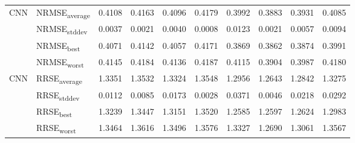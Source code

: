{\begin{longtable}{l l c c c c c c c c}
\cmidrule(lr){2-10}
\multirow{4}{*}{CNN} & NRMSE\textsubscript{average} & 0.4108 & 0.4163 & 0.4096 & 0.4179 & 0.3992 & 0.3883 & 0.3931 & 0.4085 \\
 & NRMSE\textsubscript{stddev} & 0.0037 & 0.0021 & 0.0040 & 0.0008 & 0.0123 & 0.0021 & 0.0057 & 0.0094 \\
 & NRMSE\textsubscript{best} & 0.4071 & 0.4142 & 0.4057 & 0.4171 & 0.3869 & 0.3862 & 0.3874 & 0.3991 \\
 & NRMSE\textsubscript{worst} & 0.4145 & 0.4184 & 0.4136 & 0.4187 & 0.4115 & 0.3904 & 0.3987 & 0.4180 \\
\cmidrule(lr){2-10}
\multirow{4}{*}{CNN} & RRSE\textsubscript{average} & 1.3351 & 1.3532 & 1.3324 & 1.3548 & 1.2956 & 1.2643 & 1.2842 & 1.3275 \\
 & RRSE\textsubscript{stddev} & 0.0112 & 0.0085 & 0.0173 & 0.0028 & 0.0371 & 0.0046 & 0.0218 & 0.0292 \\
 & RRSE\textsubscript{best} & 1.3239 & 1.3447 & 1.3151 & 1.3520 & 1.2585 & 1.2597 & 1.2624 & 1.2983 \\
 & RRSE\textsubscript{worst} & 1.3464 & 1.3616 & 1.3496 & 1.3576 & 1.3327 & 1.2690 & 1.3061 & 1.3567 \\
\cmidrule(lr){2-10}
\end{longtable}
}